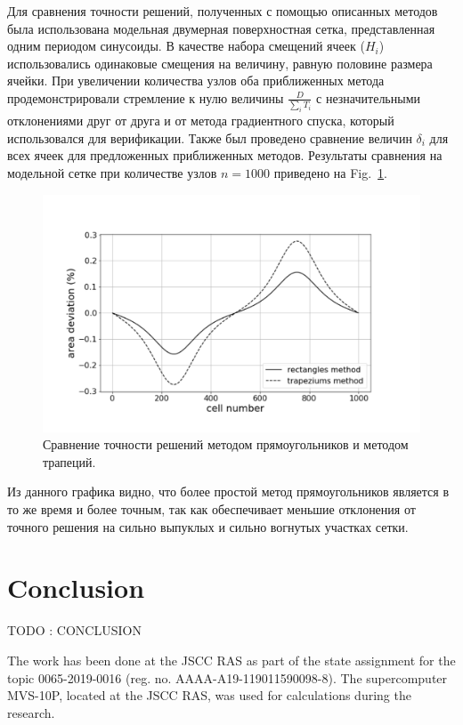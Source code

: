 \documentclass[
11pt,%
tightenlines,%
twoside,%
onecolumn,%
nofloats,%
nobibnotes,%
nofootinbib,%
superscriptaddress,%
noshowpacs,%
centertags]%
{revtex4}
\begin{document}
Для сравнения точности решений, полученных с помощью описанных методов была использована модельная двумерная поверхностная сетка, представленная одним периодом синусоиды.
В качестве набора смещений ячеек ($H_i$) использовались одинаковые смещения на величину, равную половине размера ячейки.
При увеличении количества узлов оба приближенных метода продемонстрировали стремление к нулю величины $\frac{D}{\sum_i{T_i}}$ с незначительными отклонениями друг от друга и от метода градиентного спуска, который использовался для верификации.
Также был проведено сравнение величин $\delta_i$ для всех ячеек для предложенных приближенных методов.
Результаты сравнения на модельной сетке при количестве узлов $n = 1000$ приведено на Fig.~\ref{fig:graphic}.

\begin{figure}[h]
\setcaptionmargin{5mm}
\onelinecaptionstrue
\includegraphics[width=1.0\textwidth]{pics/graphic.pdf}
\caption{Сравнение точности решений методом прямоугольников и методом трапеций.}
\label{fig:graphic}
\end{figure}

Из данного графика видно, что более простой метод прямоугольников является в то же время и более точным, так как обеспечивает меньшие отклонения от точного решения на сильно выпуклых и сильно вогнутых участках сетки.

\section{Conclusion}

TODO : CONCLUSION

\begin{acknowledgments}
The work has been done at the JSCC RAS as part of the state assignment for the topic 0065-2019-0016 (reg. no. AAAA-A19-119011590098-8). The supercomputer MVS-10P, located at the JSCC RAS, was used for calculations during the research.
\end{acknowledgments}
\end{document}

